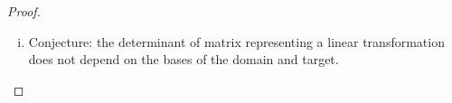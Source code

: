 \begin{proof}
\begin{enumerate}[(i)]
        Moreover, 
        \[
            \begin{aligned}
                \det B
                &=3(-1)^{2+1}B_{2,1}+4(-1)^{2+2}B_{2,2}\\
                &=-3\begin{vmatrix}
                    -4 & -3\\
                    3 & 4
                \end{vmatrix}
                +4\begin{vmatrix}
                    -4 & -3\\
                    4 & 4
                \end{vmatrix}\\
                &=-3(-16+9)+4(-16+12)=5
            \end{aligned}
        \]
        Hence, $\det B=5$.\qed
        \item Conjecture: the determinant of matrix representing a linear transformation does not depend on the bases of the domain and target.
    \end{enumerate}
    
    \renewcommand{\qedsymbol}{}
\end{proof}
